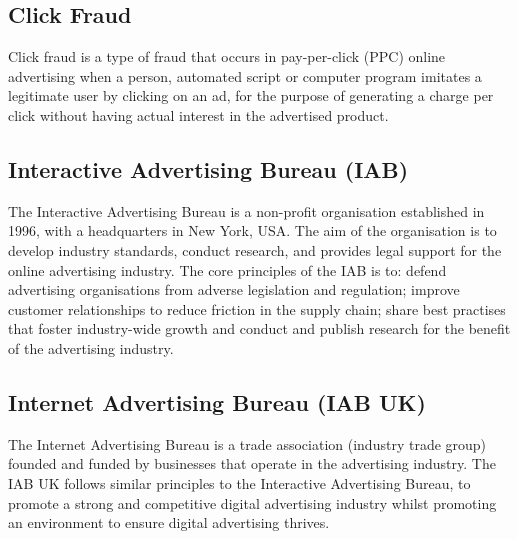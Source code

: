\documentclass[12pt]{article}
\begin{document}
\subsection{Click Fraud}
Click fraud is a type of fraud that occurs in pay-per-click (PPC) online advertising when a person, automated script or computer program imitates a legitimate user by clicking on an ad, for the purpose of generating a charge per click without having actual interest in the advertised product.

\subsection{Interactive Advertising Bureau (IAB)}
The Interactive Advertising Bureau is a non-profit organisation established in 1996, with a headquarters in New York, USA. The aim of the organisation is to develop industry standards, conduct research, and provides legal support for the online advertising industry. The core principles of the IAB is to: defend advertising organisations from adverse legislation and regulation; improve customer relationships to reduce friction in the supply chain; share best practises that foster industry-wide growth and conduct and publish research for the benefit of the advertising industry.

\subsection{Internet Advertising Bureau (IAB UK)}
The Internet Advertising Bureau is a trade association (industry trade group) founded and funded by businesses that operate in the advertising industry. The IAB UK follows similar principles to the Interactive Advertising Bureau, to promote a strong and competitive digital advertising industry whilst promoting an environment to ensure digital advertising thrives. 

\medskip
\printbibliography
\end{document}
